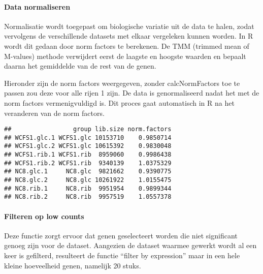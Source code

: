 \documentclass[
]{article}
\newenvironment{Shaded}{\begin{snugshade}}{\end{snugshade}}
\newcommand{\DataTypeTok}[1]{\textcolor[rgb]{0.13,0.29,0.53}{#1}}
\newcommand{\KeywordTok}[1]{\textcolor[rgb]{0.13,0.29,0.53}{\textbf{#1}}}
\newcommand{\NormalTok}[1]{#1}
\newcommand{\OperatorTok}[1]{\textcolor[rgb]{0.81,0.36,0.00}{\textbf{#1}}}
\newcommand{\StringTok}[1]{\textcolor[rgb]{0.31,0.60,0.02}{#1}}
\begin{document}
\hypertarget{data-normaliseren}{%
\paragraph{Data normaliseren}\label{data-normaliseren}}

Normalisatie wordt toegepast om biologische variatie uit de data te
halen, zodat vervolgens de verschillende datasets met elkaar vergeleken
kunnen worden. In R wordt dit gedaan door norm factors te berekenen. De
TMM (trimmed mean of M-values) methode verwijdert eerst de laagste en
hoogste waarden en bepaalt daarna het gemiddelde van de rest van de
genen.

Hieronder zijn de norm factors weergegeven, zonder calcNormFactors toe
te passen zou deze voor alle rijen 1 zijn. De data is genormaliseerd
nadat het met de norm factors vermenigvuldigd is. Dit proces gaat
automatisch in R na het veranderen van de norm factors.

\begin{Shaded}
\end{Shaded}

\begin{verbatim}
##                 group lib.size norm.factors
## WCFS1.glc.1 WCFS1.glc 10153710    0.9850714
## WCFS1.glc.2 WCFS1.glc 10615392    0.9830048
## WCFS1.rib.1 WCFS1.rib  8959060    0.9986438
## WCFS1.rib.2 WCFS1.rib  9340139    1.0375329
## NC8.glc.1     NC8.glc  9821662    0.9390775
## NC8.glc.2     NC8.glc 10261922    1.0155475
## NC8.rib.1     NC8.rib  9951954    0.9899344
## NC8.rib.2     NC8.rib  9957519    1.0557378
\end{verbatim}

\hypertarget{filteren-op-low-counts}{%
\paragraph{Filteren op low counts}\label{filteren-op-low-counts}}

Deze functie zorgt ervoor dat genen geselecteert worden die niet
significant genoeg zijn voor de dataset. Aangezien de dataset waarmee
gewerkt wordt al een keer is gefilterd, resulteert de functie ``filter
by expression'' maar in een hele kleine hoeveelheid genen, namelijk 20
stuks.
\end{document}
